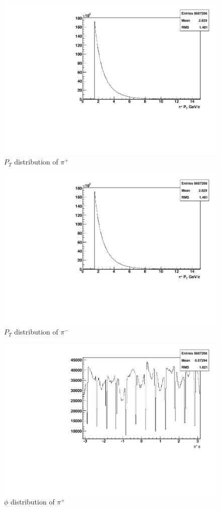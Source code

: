 \documentclass[abstract = on,listof=totoc, bibliography=totoc]{scrreprt}
\begin{document}
\FloatBarrier
\begin{figure}
\begin{center}
\includegraphics[width = .8\textwidth]{hPosPt}
\caption[$P_{T}$ distribution of $\pi^+$]{$P_{T}$ distribution of $\pi^+$}
\label{fig:posPt}
\end{center}
\end{figure}

\begin{figure}
\begin{center}
\includegraphics[width = .8\textwidth]{hNegPt}
\caption[$P_{T}$ distribution of $\pi^-$]{$P_{T}$ distribution of $\pi^-$}
\label{fig:negpt}
\end{center}
\end{figure}

\begin{figure}
\begin{center}
\includegraphics[width = .8\textwidth]{hPosPhi}
\caption[$\phi$ distribution of $\pi^+$]{$\phi$ distribution of $\pi^+$}
\label{fig:posphi}
\end{center}
\end{figure}
\end{document}
